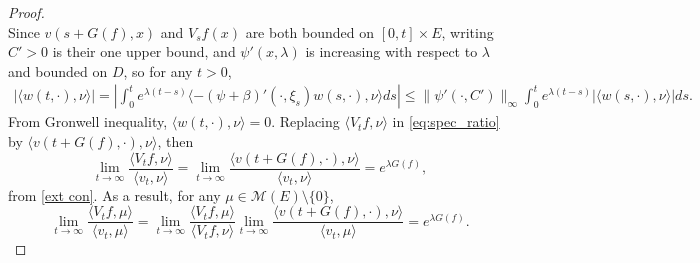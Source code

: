 \documentclass[12pt,a4paper]{amsart}
\numberwithin{equation}{section}
\theoremstyle{plain}
\theoremstyle{definition}
\begin{document}
\begin{proof}
\[  \]
	Since $v(s+G(f),x)$ and $V_sf(x)$ are both bounded on $[0,t]\times E$, writing $C'>0$ is their one upper bound, and $\psi'(x, \lambda)$ is increasing with respect to $\lambda$ and bounded on $D$, so for any $t>0$,
  \begin{eqnarray*}
    |\langle w(t,\cdot),\nu\rangle |=|\int_0^te^{\lambda(t-s)}\langle -(\psi+\beta)'(\cdot, \xi_s)w(s,\cdot),\nu\rangle ds|\leq \|\psi'(\cdot,C')\|_\infty\int_0^te^{\lambda(t-s)}|\langle w(s,\cdot),\nu\rangle |ds.
  \end{eqnarray*}
	From Gronwell inequality, $\langle w(t,\cdot),\nu\rangle =0$.  Replacing $\langle V_tf,\nu\rangle $ in \eqref{eq:spec_ratio} by $\langle v(t+G(f),\cdot),\nu\rangle $, then
  \[
    \lim_{t\rightarrow\infty}\frac{\langle V_tf,\nu\rangle }{\langle v_t,\nu\rangle }=
    \lim_{t\rightarrow\infty}\frac{\langle v(t+G(f),\cdot),\nu\rangle }{\langle v_t,\nu\rangle }=e^{\lambda G(f)},
  \]
	from \eqref{ext con}.  As a result, for any $\mu\in\mathcal M(E)\setminus\{0\}$,
  \[
    \lim_{t\rightarrow\infty}\frac{\langle V_tf,\mu\rangle }{\langle v_t,\mu\rangle }
    =\lim_{t\rightarrow\infty}\frac{\langle V_tf,\mu\rangle }{\langle V_tf,\nu\rangle }
    \lim_{t\rightarrow\infty}\frac{\langle v(t+G(f),\cdot),\nu\rangle }{\langle v_t,\mu\rangle }=e^{\lambda G(f)}.
  \]
\end{proof}
\end{document}

